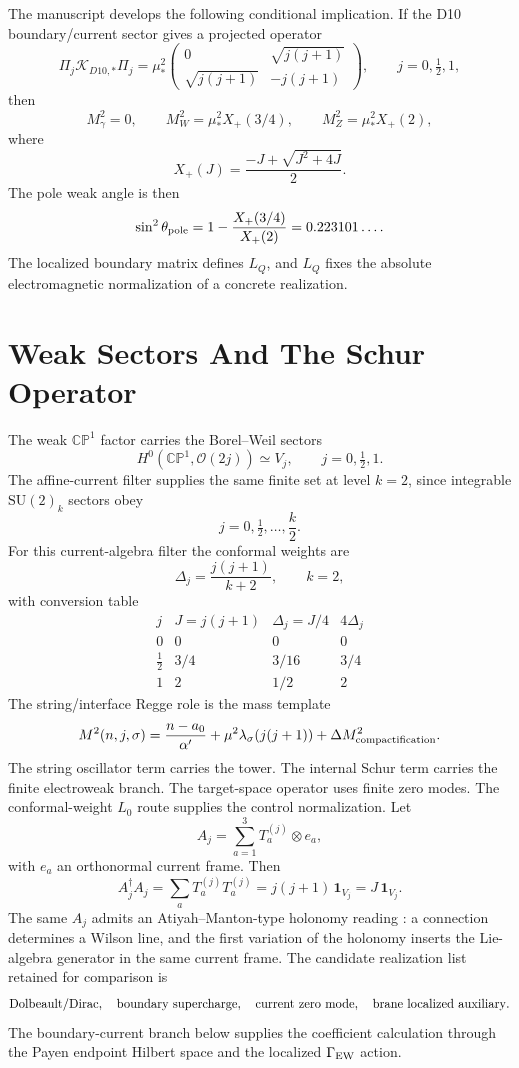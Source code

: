 \documentclass[11pt]{article}
\theoremstyle{definition}
\theoremstyle{remark}
\newcommand{\SU}{\mathrm{SU}}
\newcommand{\CP}{\mathbb{CP}}
\newcommand{\half}{\tfrac12}
\newcommand{\cK}{\mathcal K}
\newcommand{\cO}{\mathcal O}
\newcommand{\Xp}{X_+}
\begin{document}
The manuscript develops the following conditional implication.  If the D10
boundary/current sector gives a projected operator
\[
  \Pi_j\cK_{D10,*}\Pi_j
  =
  \mu_*^2
  \begin{pmatrix}
  0&\sqrt{j(j+1)}\\
  \sqrt{j(j+1)}&-j(j+1)
  \end{pmatrix},
  \qquad
  j=0,\half,1,
\]
then
\[
  M_\gamma^2=0,\qquad
  M_W^2=\mu_*^2\Xp(3/4),\qquad
  M_Z^2=\mu_*^2\Xp(2),
\]
where
\[
  \Xp(J)=\frac{-J+\sqrt{J^2+4J}}{2}.
\]
The pole weak angle is then
\[
  \sin^2\theta_{\rm pole}
  =
  1-\frac{\Xp(3/4)}{\Xp(2)}
  =
  0.223101\ldots .
\]
The localized boundary matrix defines \(L_Q\), and \(L_Q\) fixes the absolute
electromagnetic normalization of a concrete realization.

\section{Weak Sectors And The Schur Operator}

The weak \(\CP^1\) factor carries the Borel--Weil sectors
\[
  H^0(\CP^1,\cO(2j))\simeq V_j,\qquad j=0,\half,1.
\]
The affine-current filter supplies the same finite set at level \(k=2\),
since integrable \(\SU(2)_k\) sectors obey
\[
  j=0,\half,\ldots,\frac{k}{2}.
\]
For this current-algebra filter the conformal weights are
\[
  \Delta_j=\frac{j(j+1)}{k+2},
  \qquad k=2,
\]
with conversion table
\[
\begin{array}{c|c|c|c}
j&J=j(j+1)&\Delta_j=J/4&4\Delta_j\\
\hline
0&0&0&0\\
\half&3/4&3/16&3/4\\
1&2&1/2&2
\end{array}
\]
The string/interface Regge role is the mass template
\[
  M^2(n,j,\sigma)
  =
  \frac{n-a_0}{\alpha'}
  +\mu^2\lambda_\sigma(j(j+1))
  +\Delta M^2_{\rm compactification}.
\]
The string oscillator term carries the tower.  The internal Schur term
carries the finite electroweak branch.
The target-space operator uses finite zero modes.  The conformal-weight
\(L_0\) route supplies the control normalization.  Let
\[
  A_j=\sum_{a=1}^3T_a^{(j)}\otimes e_a,
\]
with \(e_a\) an orthonormal current frame.  Then
\[
  A_j^\dagger A_j
  =
  \sum_aT_a^{(j)}T_a^{(j)}
  =
  j(j+1)\,\bm 1_{V_j}
  =
  J\,\bm 1_{V_j}.
\]
The same \(A_j\) admits an Atiyah--Manton-type holonomy reading
\cite{AtiyahMantonSchroers2011}: a connection determines a Wilson line, and
the first variation of the holonomy inserts the Lie-algebra generator in the
same current frame.  The candidate realization list retained for comparison is
\[
  {\rm Dolbeault/Dirac},\quad
  {\rm boundary\ supercharge},\quad
  {\rm current\ zero\ mode},\quad
  {\rm brane\ localized\ auxiliary}.
\]
The boundary-current branch below supplies the coefficient calculation through
the Payen endpoint Hilbert space and the localized \(\Gamma_{\rm EW}\) action.
\end{document}
